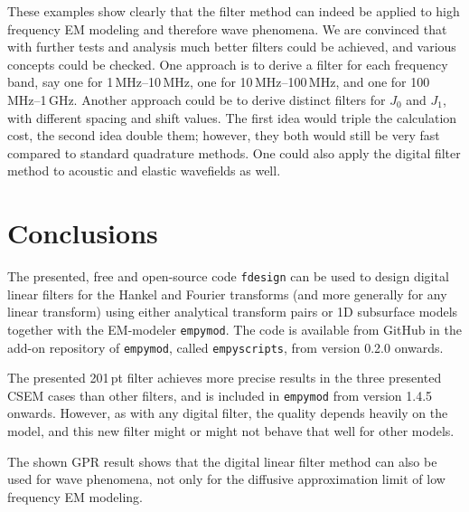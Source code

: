 \documentclass[paper,twocolumn,twoside]{geophysics}
\begin{document}
%
%

These examples show clearly that the filter method can indeed be applied to
high frequency EM modeling and therefore wave phenomena. We are convinced that
with further tests and analysis much better filters could be achieved, and
various concepts could be checked. One approach is to derive a filter for each
frequency band, say one for 1\,MHz--10\,MHz, one for 10\,MHz--100\,MHz, and one
for 100\,MHz--1\,GHz. Another approach could be to derive distinct filters for
$J_0$ and $J_1$, with different spacing and shift values. The first idea would
triple the calculation cost, the second idea double them; however, they both
would still be very fast compared to standard quadrature methods. One could
also apply the digital filter method to acoustic and elastic wavefields as
well.

\section{Conclusions}

The presented, free and open-source code \texttt{fdesign} can be used to design
digital linear filters for the Hankel and Fourier transforms (and more
generally for any linear transform) using either analytical transform pairs or
1D subsurface models together with the EM-modeler \texttt{empymod}. The code is
available from GitHub in the add-on repository of \texttt{empymod}, called
\texttt{empyscripts}, from version 0.2.0 onwards.

The presented 201\,pt filter achieves more precise results in the three
presented CSEM cases than other filters, and is included in \texttt{empymod}
from version 1.4.5 onwards. However, as with any digital filter, the quality
depends heavily on the model, and this new filter might or might not behave
that well for other models.

The shown GPR result shows that the digital linear filter method can also be
used for wave phenomena, not only for the diffusive approximation limit of low
frequency EM modeling.
\end{document}
